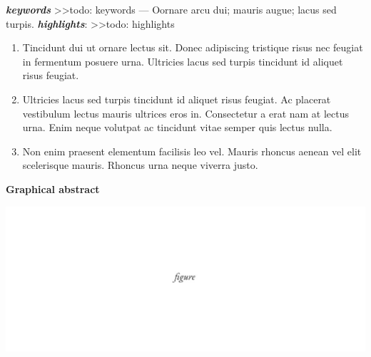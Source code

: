 \documentclass[12pt]{article}
\begin{document}
\begin{adjustwidth}{20pt}{20pt}
\begin{spacing}{0.8}
    \noindent \textit{\textbf{keywords}} >>todo: keywords --- Oornare arcu dui; mauris augue; lacus sed turpis.
    \newline
    \newline
    \newline
    \noindent \textit{\textbf{highlights}}:
        >>todo: highlights
        \begin{enumerate}
            \item Tincidunt dui ut ornare lectus sit. Donec adipiscing tristique risus nec feugiat in fermentum posuere urna. Ultricies lacus sed turpis tincidunt id aliquet risus feugiat. 
            \item Ultricies lacus sed turpis tincidunt id aliquet risus feugiat. Ac placerat vestibulum lectus mauris ultrices eros in. Consectetur a erat nam at lectus urna. Enim neque volutpat ac tincidunt vitae semper quis lectus nulla.
            \item Non enim praesent elementum facilisis leo vel. Mauris rhoncus aenean vel elit scelerisque mauris. Rhoncus urna neque viverra justo. 
        \end{enumerate}
\end{spacing}
\clearpage
\begin{center}
    \vspace{10mm}
    \textsf{\textbf{Graphical abstract}}
    \vspace{5mm}
\end{center}
    
\end{adjustwidth}
    
\begin{center}
    \includegraphics[scale=0.75]{figs/fig.jpg}
\end{center}        
\clearpage

\normalsize

\tableofcontents
\clearpage    
\end{document}
